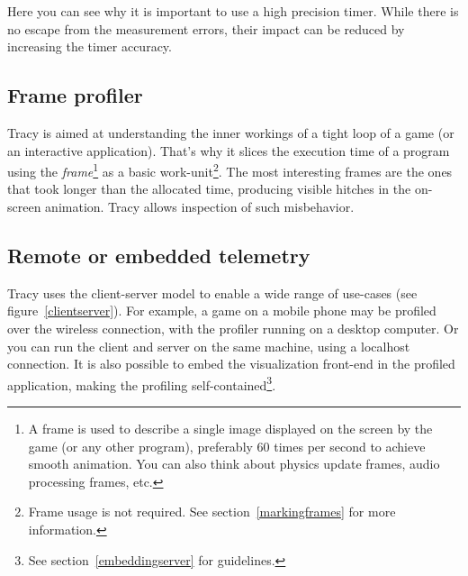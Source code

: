 \documentclass[hidelinks,titlepage,a4paper]{article}
\begin{document}
Here you can see why it is important to use a high precision timer. While there is no escape from the measurement errors, their impact can be reduced by increasing the timer accuracy.

\subsection{Frame profiler}

Tracy is aimed at understanding the inner workings of a tight loop of a game (or an interactive application). That's why it slices the execution time of a program using the \emph{frame}\footnote{A frame is used to describe a single image displayed on the screen by the game (or any other program), preferably 60 times per second to achieve smooth animation. You can also think about physics update frames, audio processing frames, etc.} as a basic work-unit\footnote{Frame usage is not required. See section~\ref{markingframes} for more information.}. The most interesting frames are the ones that took longer than the allocated time, producing visible hitches in the on-screen animation. Tracy allows inspection of such misbehavior.

\subsection{Remote or embedded telemetry}

Tracy uses the client-server model to enable a wide range of use-cases (see figure~\ref{clientserver}). For example, a game on a mobile phone may be profiled over the wireless connection, with the profiler running on a desktop computer. Or you can run the client and server on the same machine, using a localhost connection. It is also possible to embed the visualization front-end in the profiled application, making the profiling self-contained\footnote{See section~\ref{embeddingserver} for guidelines.}.
\end{document}
